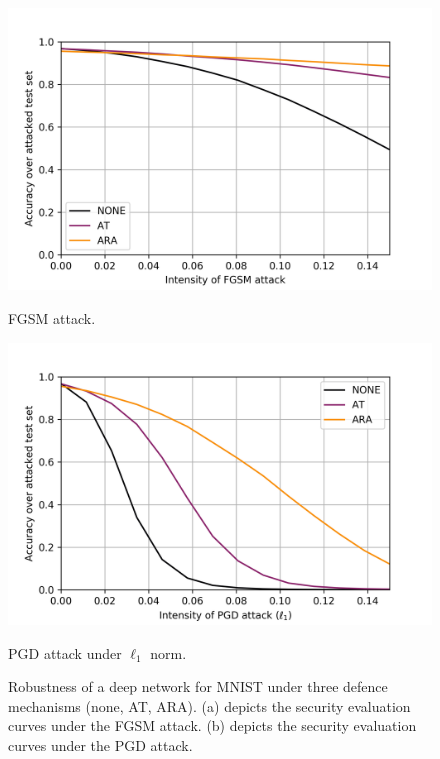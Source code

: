\begin{figure}[!htb]
\begin{center}
\hspace{-0.5em}
  \includegraphics[width=\textwidth]{figures/comparison_mnist_fgsm.png}
   \caption{FGSM attack.}
\endminipage\hfill
{}
  \includegraphics[width=\textwidth]{figures/comparison_mnist_pgdl1.png}
   \caption{PGD attack under $\ell_1$ norm.}
\endminipage
\end{center}
\caption{Robustness of a deep network for MNIST under three defence mechanisms 
(none, AT, ARA). (a) depicts the security evaluation curves under the FGSM attack. (b) depicts the security evaluation curves under the PGD attack.}\label{fig:comparison_mnist}
\end{figure}

\iffalse

